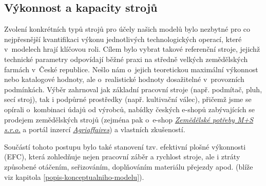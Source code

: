 \documentclass[11pt,a4paper]{article}
\begin{document}
\subsection{Výkonnost a kapacity strojů}

Zvolení konkrétních typů strojů pro účely našich modelů bylo nezbytné pro co nejpřesnější kvantifikaci výkonu jednotlivých technologických operací, které v~modelech hrají klíčovou roli. Cílem bylo vybrat takové referenční stroje, jejichž technické parametry odpovídají běžné praxi na středně velkých zemědělských farmách v~České republice. Nešlo nám o~jejich teoretickou maximální výkonnost nebo katalogové hodnoty, ale o~realistické hodnoty dosažitelné v~provozních podmínkách. Výběr zahrnoval jak základní pracovní stroje (např. podmítač, pluh, secí stroj), tak i podpůrné prostředky (např. kultivační válec), přičemž jsme se opírali o~kombinaci údajů od výrobců, nabídky českých e-shopů zabývajících se prodejem zemědělských strojů (zejména pak o~e-shop \emph{\href{https://www.eshop-zemedelske-potreby.cz/}{Zemědělské potřeby M+S s.r.o.}} a portál inzercí \emph{\href{https://www.agriaffaires.cz/}{Agriaffaires}}) a vlastních zkušeností. 

Součástí tohoto postupu bylo také stanovení tzv. efektivní plošné výkonnosti (EFC), která zohledňuje nejen pracovní záběr a rychlost stroje, ale i ztráty způsobené otáčením, seřizováním, doplňováním materiálu přejezdy apod. (blíže viz kapitola \ref{popis-konceptualniho-modelu}).
\end{document}
